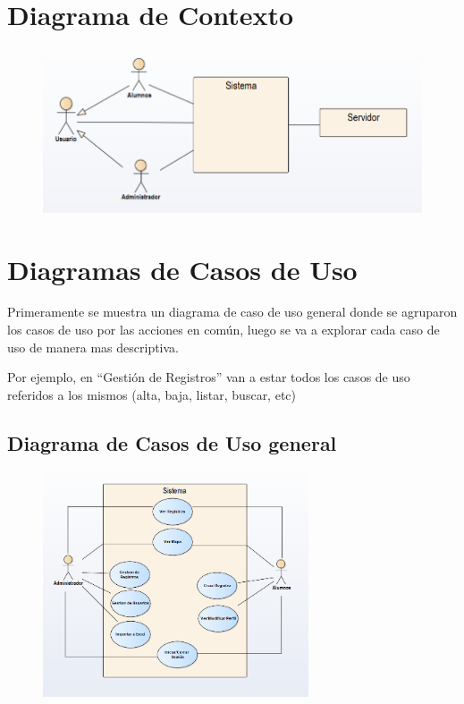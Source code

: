 \section{Diagrama de Contexto}

\begin{figure}[H]
  \centering
   
    \includegraphics[width=1\textwidth]{imagenes/analisis/diagrama-contexto.png}
	\label{fig:casos-de-uso}
\end{figure}

\section{Diagramas de Casos de Uso}

Primeramente se muestra un diagrama de caso de uso general donde se agruparon los casos de uso por las acciones en común, luego se va a explorar cada caso de uso de manera mas descriptiva.

Por ejemplo, en ``Gestión de Registros'' van a estar todos los casos de uso referidos a los mismos (alta, baja, listar, buscar, etc)

\subsection{Diagrama de Casos de Uso general}

\begin{figure}[H]
  \centering
    \includegraphics[width=0.7\textwidth]{imagenes/analisis/casos-uso-general.png}
	\label{fig:casos-de-uso}
\end{figure}

